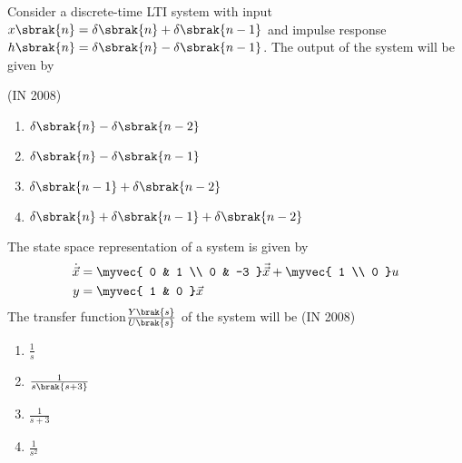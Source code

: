 \item  Consider a discrete-time LTI system with input $x\sbrak{n} = \delta \sbrak{n} +\delta\sbrak{n-1} $ and impulse response $h\sbrak{n} =\delta\sbrak{n}-\delta\sbrak{n-1}$. The output of the system will be given by 

	\hfill{(IN 2008)}
\begin{multicols}{2}
  \begin{enumerate} 
        \item $\delta\sbrak{n}-\delta\sbrak{n-2}$
        \item $\delta\sbrak{n}-\delta\sbrak{n-1}$
        \item $\delta\sbrak{n-1}+\delta\sbrak{n-2}$
        \item $\delta\sbrak{n}+\delta\sbrak{n-1}+\delta\sbrak{n-2}$
  \end{enumerate}
  \end{multicols}
\item The state space representation of a system is given by 
\begin{align*}
\dot{\vec{x}} &= 
\myvec{
0 & 1 \\
0 & -3
} \vec{\vec{x}}
+ 
\myvec{
1 \\
0
} u
\\
y &= 
\myvec{
1 & 0
} \vec{x}
\end{align*}
%
The transfer function$\frac{Y\brak{s}}{U\brak{s}}$ of the system will be \hfill{(IN 2008)}
\begin{multicols}{4}
           \begin{enumerate} 
              \item $\frac{1}{s}$           
              \item $\frac{1}{s\brak{s+3}}$
              \item $\frac{1}{s+3}$
              \item $\frac{1}{s^2}$
            \end{enumerate}
            \end{multicols}

